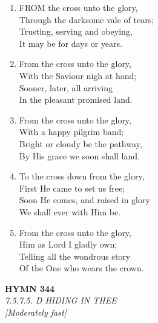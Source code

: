 \documentclass[11pt,a4paper]{article}
\begin{document}
\begin{enumerate}
    \item FROM the cross unto the glory, \\
        Through the darksome vale of tears; \\
        Trusting, serving and obeying, \\
        It may be for days or years.

    \item From the cross unto the glory, \\
        With the Saviour nigh at hand; \\
        Sooner, later, all arriving \\
        In the pleasant promised land.

    \item From the cross unto the glory, \\
        With a happy pilgrim band; \\
        Bright or cloudy be the pathway, \\
        By His grace we soon shall land.

    \item To the cross down from the glory, \\
        First He came to set us free; \\
        Soon He comes, and raised in glory \\
        We shall ever with Him be.

    \item From the cross unto the glory, \\
        Him as Lord I gladly own; \\
        Telling all the wondrous story \\
        Of the One who wears the crown.

\end{enumerate}

\newpage
\begin{center}
    {\Large \textbf{HYMN 344}}
    \\
    \textit{7.5.7.5. D HIDING IN THEE}
    \\
    \textit{\small [Moderately fast]}
\end{center}
\vspace{1em}
\end{document}
